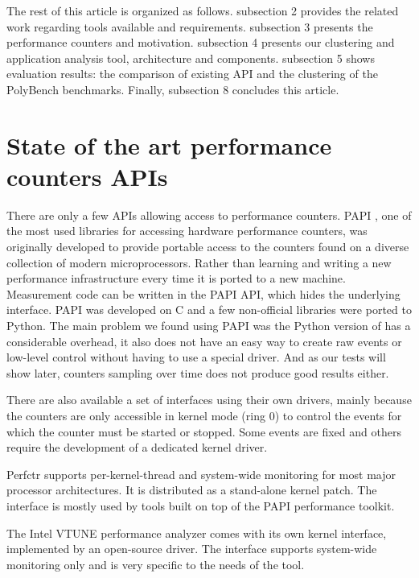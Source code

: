 The rest of this article is organized as follows. subsection 2 provides the related work regarding tools available and requirements. subsection 3 presents the performance counters and motivation. subsection 4 presents our clustering and application analysis tool, architecture and components. subsection 5 shows evaluation results: the comparison of existing API and the clustering of the PolyBench benchmarks. Finally, subsection 8 concludes this article.

\section{State of the art performance counters APIs} \label{sec:state_of_the_art_performance_counters_APIs}

There are only a few APIs allowing access to performance counters.
PAPI \cite{Weaver2013Non-determinismImplementations, Mucci1999PAPI}, one of the most used libraries for accessing hardware performance counters, was originally developed to provide portable access to the counters found on a diverse collection of modern microprocessors. Rather than learning and writing a new performance infrastructure every time it is ported to a new machine. Measurement code can be written in the PAPI API, which hides the underlying interface.  
PAPI was developed on C and a few non-official libraries were ported to Python. The main problem we found using PAPI was the Python version of has a considerable overhead, it also does not have an easy way to create raw events or low-level control without having to use a special driver. And as our tests will show later, counters sampling over time does not produce good results either.

There are also available a set of interfaces using their own drivers, mainly because the counters are only accessible in kernel mode (ring 0) to control the events for which the counter must be started or stopped. Some events are fixed and others require the development of a dedicated kernel driver. 

Perfctr \cite{Nikolaev2011Perfctr} supports per-kernel-thread and system-wide monitoring for most major processor architectures. It is distributed as a stand-alone kernel patch. The interface is mostly used by tools built on top of the PAPI performance toolkit. 

The Intel VTUNE \cite{Intel2021Vtune} performance analyzer comes with its own kernel interface, implemented by an open-source driver. The interface supports system-wide monitoring only and is very specific to the needs of the tool.

